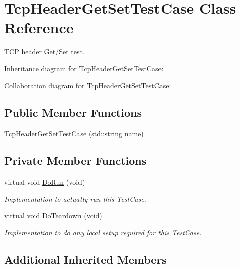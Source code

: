 \hypertarget{classTcpHeaderGetSetTestCase}{}\section{Tcp\+Header\+Get\+Set\+Test\+Case Class Reference}
\label{classTcpHeaderGetSetTestCase}


T\+CP header Get/\+Set test.  




Inheritance diagram for Tcp\+Header\+Get\+Set\+Test\+Case\+:


Collaboration diagram for Tcp\+Header\+Get\+Set\+Test\+Case\+:
\subsection*{Public Member Functions}
\begin{DoxyCompactItemize}
\item 
\hyperlink{classTcpHeaderGetSetTestCase_aaad9cc0d4f98594d931aaa7d0d8ca306}{Tcp\+Header\+Get\+Set\+Test\+Case} (std\+::string \hyperlink{generate__test__data__lte__spectrum__model_8m_ab74e6bf80237ddc4109968cedc58c151}{name})
\end{DoxyCompactItemize}
\subsection*{Private Member Functions}
\begin{DoxyCompactItemize}
\item 
virtual void \hyperlink{classTcpHeaderGetSetTestCase_ae5c6a3e802b8648d197d5a22509acf49}{Do\+Run} (void)
\begin{DoxyCompactList}\small\item\em Implementation to actually run this Test\+Case. \end{DoxyCompactList}\item 
virtual void \hyperlink{classTcpHeaderGetSetTestCase_a5e90fdcaf386aaa5984a52f6c6e5341f}{Do\+Teardown} (void)
\begin{DoxyCompactList}\small\item\em Implementation to do any local setup required for this Test\+Case. \end{DoxyCompactList}\end{DoxyCompactItemize}
\subsection*{Additional Inherited Members}


